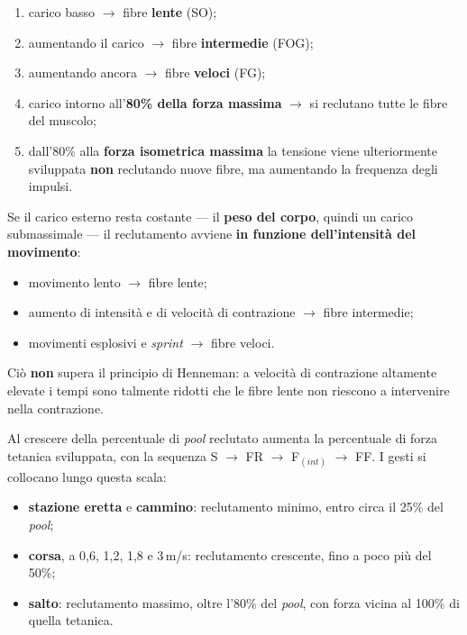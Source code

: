 \begin{enumerate}
  \item carico basso $\rightarrow$ fibre \textbf{lente} (SO);
  \item aumentando il carico $\rightarrow$ fibre \textbf{intermedie} (FOG);
  \item aumentando ancora $\rightarrow$ fibre \textbf{veloci} (FG);
  \item carico intorno all'\textbf{80\% della forza massima} $\rightarrow$ si reclutano tutte le
    fibre del muscolo;
  \item dall'80\% alla \textbf{forza isometrica massima} la tensione viene ulteriormente
    sviluppata \textbf{non} reclutando nuove fibre, ma aumentando la frequenza degli impulsi.
\end{enumerate}

Se il carico esterno resta costante --- il \textbf{peso del corpo}, quindi un carico
submassimale --- il reclutamento avviene \textbf{in funzione dell'intensità del movimento}:
\begin{itemize}
  \item movimento lento $\rightarrow$ fibre lente;
  \item aumento di intensità e di velocità di contrazione $\rightarrow$ fibre intermedie;
  \item movimenti esplosivi e \textit{sprint} $\rightarrow$ fibre veloci.
\end{itemize}

Ciò \textbf{non} supera il principio di Henneman: a velocità di contrazione altamente elevate i
tempi sono talmente ridotti che le fibre lente non riescono a intervenire nella contrazione.

Al crescere della percentuale di \textit{pool} reclutato aumenta la percentuale di forza tetanica
sviluppata, con la sequenza S $\rightarrow$ FR $\rightarrow$ F$_{(int)}$ $\rightarrow$ FF. I gesti
si collocano lungo questa scala:
\begin{itemize}
  \item \textbf{stazione eretta} e \textbf{cammino}: reclutamento minimo, entro circa il 25\% del
    \textit{pool};
  \item \textbf{corsa}, a 0,6, 1,2, 1,8 e 3\,m/s: reclutamento crescente, fino a poco più del
    50\%;
  \item \textbf{salto}: reclutamento massimo, oltre l'80\% del \textit{pool}, con forza vicina al
    100\% di quella tetanica.
\end{itemize}


